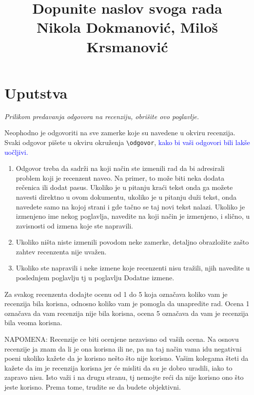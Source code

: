 \documentclass[a4paper]{report}
\newcommand{\odgovor}[1]{\textcolor{blue}{#1}}
\begin{document}
\title{Dopunite naslov svoga rada\\ \small{Nikola Dokmanović, Miloš Krsmanović}}

\maketitle

\tableofcontents

\chapter{Uputstva}
\emph{Prilikom predavanja odgovora na recenziju, obrišite ovo poglavlje.}

Neophodno je odgovoriti na sve zamerke koje su navedene u okviru recenzija. Svaki odgovor pišete u okviru okruženja \verb"\odgovor", \odgovor{kako bi vaši odgovori bili lakše uočljivi.} 
\begin{enumerate}

\item Odgovor treba da sadrži na koji način ste izmenili rad da bi adresirali problem koji je recenzent naveo. Na primer, to može biti neka dodata rečenica ili dodat pasus. Ukoliko je u pitanju kraći tekst onda ga možete navesti direktno u ovom dokumentu, ukoliko je u pitanju duži tekst, onda navedete samo na kojoj strani i gde tačno se taj novi tekst nalazi. Ukoliko je izmenjeno ime nekog poglavlja, navedite na koji način je izmenjeno, i slično, u zavisnosti od izmena koje ste napravili. 

\item Ukoliko ništa niste izmenili povodom neke zamerke, detaljno obrazložite zašto zahtev recenzenta nije uvažen.

\item Ukoliko ste napravili i neke izmene koje recenzenti nisu tražili, njih navedite u poslednjem poglavlju tj u poglavlju Dodatne izmene.
\end{enumerate}

Za svakog recenzenta dodajte ocenu od 1 do 5 koja označava koliko vam je recenzija bila korisna, odnosno koliko vam je pomogla da unapredite rad. Ocena 1 označava da vam recenzija nije bila korisna, ocena 5 označava da vam je recenzija bila veoma korisna. 

NAPOMENA: Recenzije ce biti ocenjene nezavisno od vaših ocena. Na osnovu recenzije ja znam da li je ona korisna ili ne, pa na taj način vama idu negativni poeni ukoliko kažete da je korisno nešto što nije korisno. Vašim kolegama šteti da kažete da im je recenzija korisna jer će misliti da su je dobro uradili, iako to zapravo nisu. Isto važi i na drugu stranu, tj nemojte reći da nije korisno ono što jeste korisno. Prema tome, trudite se da budete objektivni. 
\end{document}
